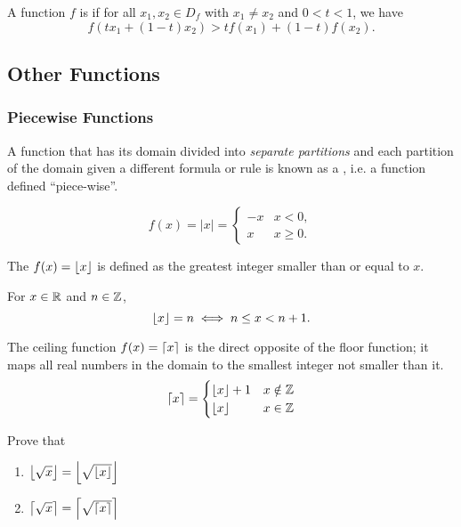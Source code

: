 \begin{definition}
A function $f$ is  if for all $x_1,x_2\in D_f$ with $x_1\neq x_2$ and $0<t<1$, we have
\[ f(tx_1+(1-t)x_2)>tf(x_1)+(1-t)f(x_2). \]
\end{definition}

\subsection{Other Functions}
\subsubsection{Piecewise Functions}
A function that has its domain divided into \emph{separate partitions} and each partition of the domain given a different formula or rule is known as a , i.e. a function defined ``piece-wise''.

\begin{definition}
\[ f(x)=|x|=\begin{cases}
-x & x<0, \\
x & x\ge0.
\end{cases} \]
\end{definition}

\begin{definition}
The  $f(x)=\left\lfloor x \right\rfloor$ is defined as the greatest integer smaller than or equal to $x$.

For $x\in\mathbb R$ and $n\in\mathbb Z$,
\[ \left\lfloor x \right\rfloor=n\iff n\le x<n+1. \]
\end{definition}

\begin{definition}
The ceiling function $f(x)=\left\lceil x \right\rceil$ is the direct opposite of the floor function; it maps all real numbers in the domain to the smallest integer not smaller than it.
\[ \left\lceil x \right\rceil=\begin{cases}
\left\lfloor x \right\rfloor+1 & x\notin\mathbb Z \\
\left\lfloor x \right\rfloor & x\in\mathbb Z
\end{cases} \]
\end{definition}

\begin{exercise}
Prove that
\begin{enumerate}[label=(\alph*)]
\item $\left\lfloor \sqrt{x} \right\rfloor=\left\lfloor \sqrt{\left\lfloor x \right\rfloor} \right\rfloor$
\item $\left\lceil \sqrt{x} \right\rceil=\left\lceil \sqrt{\left\lceil x \right\rceil} \right\rceil$
\end{enumerate}
\end{exercise}

